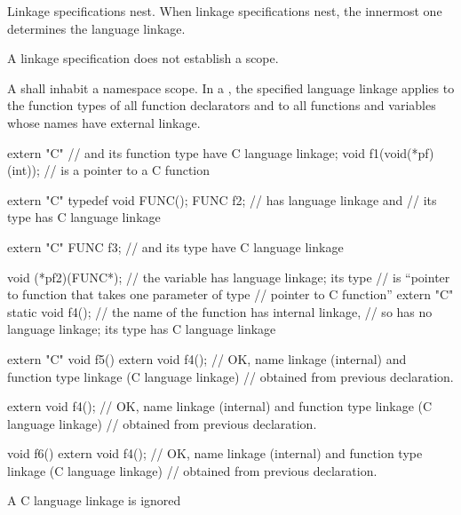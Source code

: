 \pnum
{}%
Linkage specifications nest. When linkage specifications nest, the
innermost one determines the language linkage.
\begin{note}
A linkage specification does not establish a scope.
\end{note}
A  shall inhabit a namespace scope.
In a ,
the specified language linkage applies
to the function types of all function declarators and
to all functions and variables whose names have external linkage.
\begin{example}
\begin{codeblock}
extern "C"                      //  and its function type have C language linkage;
  void f1(void(*pf)(int));      //  is a pointer to a C function

extern "C" typedef void FUNC();
FUNC f2;                        //  has \Cpp{} language linkage and
                                // its  type has C language linkage

extern "C" FUNC f3;             //  and its type have C language linkage

void (*pf2)(FUNC*);             // the variable  has \Cpp{} language linkage; its type
                                // is ``pointer to \Cpp{} function that takes one parameter of type
                                // pointer to C function''
extern "C" {
  static void f4();             // the name of the function  has internal linkage,
                                // so  has no language linkage; its type has C language linkage
}

extern "C" void f5() {
  extern void f4();             // OK, name linkage (internal) and function type linkage (C language linkage)
                                // obtained from previous declaration.
}

extern void f4();               // OK, name linkage (internal) and function type linkage (C language linkage)
                                // obtained from previous declaration.

void f6() {
  extern void f4();             // OK, name linkage (internal) and function type linkage (C language linkage)
                                // obtained from previous declaration.
}
\end{codeblock}
\end{example}
%
A C language linkage is ignored
